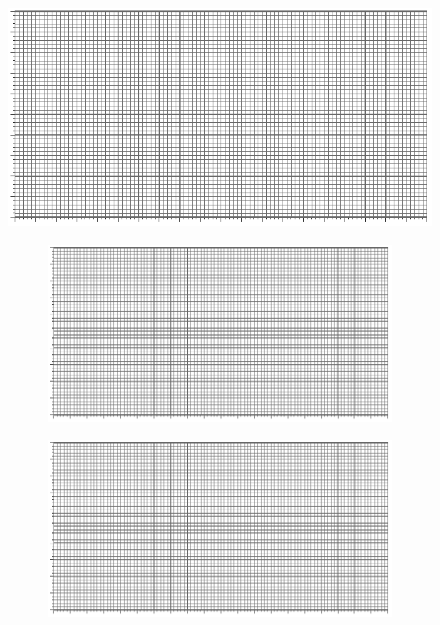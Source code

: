 \documentclass[UTF8]{article}
\begin{document}
\begin{figure}[H]\centering
\includegraphics[width=0.65\columnwidth]{assets/100x50.pdf}
\end{figure}

\begin{figure}[H]\centering
\begin{subfigure}[b]{0.5\columnwidth}\centering
    \includegraphics[width=\columnwidth]{assets/100x50.pdf}
\end{subfigure}\hfill
\begin{subfigure}[b]{0.5\columnwidth}\centering
    \includegraphics[width=\columnwidth]{assets/100x50.pdf}
\end{subfigure}
\end{figure}
\end{document}

